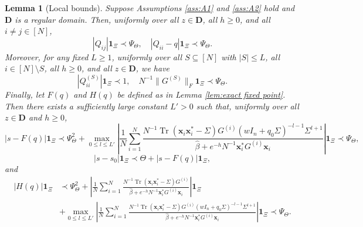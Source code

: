 \documentclass[11pt,reqno]{amsart}
\def\x{\mathbf{x}}
\def\1{\mathbf{1}}
\def\bD{\mathbf{D}}
\def\Tr{\operatorname{Tr}}
\newtheorem{lemma}[theorem]{Lemma}
\theoremstyle{definition}
\numberwithin{equation}{section}
\numberwithin{figure}{section}
\begin{document}
\begin{lemma}[Local bounds]\label{lem:local bounds}
Suppose Assumptions \ref{ass:A1} and \ref{ass:A2} hold and $\bD$ is a regular domain. Then, uniformly over all $z\in\bD$, all $h\geq 0$, and all $i\neq j\in[N]$,
\[
    |Q_{ij}|\1_\Xi\prec \Psi_\Theta,\quad |Q_{ii}-q|\1_\Xi\prec\Psi_\Theta.
\]
Moreover, for any fixed $L\ge 1$, uniformly over all $S\subseteq[N]$ with $|S|\leq L$, all $i\in[N]\setminus S$, all $h\geq 0$, and all $z\in\bD$, we have
\[
    |Q_{ii}^{(S)}|\1_\Xi\prec 1,\quad N^{-1}\|G^{(S)}\|_F\1_\Xi\prec\Psi_\Theta. 
\]
Finally, let $F(q)$ and $H(q)$ be defined as in Lemma \ref{lem:exact fixed point}. Then there exists a sufficiently large constant $L'>0$ such that, uniformly over all $z\in\bD$ and $h\geq 0$,
\[
    |s-F(q)|\1_\Xi\prec\Psi_\Theta^2+\max_{0\leq l\leq L'}\left|\frac{1}{N}\sum_{i=1}^N\frac{N^{-1}\Tr(\x_i\x_i^*-\Sigma)G^{(i)}(wI_n+q_0\Sigma)^{-l-1}\Sigma^{l+1}}{\hat\beta+e^{-h}N^{-1}\x_i^*G^{(i)}\x_i}\right|\1_\Xi\prec \Psi_\Theta,
\]
\[
    |s-s_0|\1_\Xi\prec\Theta+|s-F(q)|\1_\Xi,
\]
and
\begin{align*}
    |H(q)|\1_\Xi&\prec \Psi_\Theta^2+\left|\frac{1}{N}\sum_{i=1}^N\frac{N^{-1}\Tr(\x_i\x_i^*-\Sigma)G^{(i)}}{\hat\beta+e^{-h}N^{-1}\x_i^*G^{(i)}\x_i}\right|\1_\Xi\\
    &+\max_{0\leq l\leq L'}\left|\frac{1}{N}\sum_{i=1}^N\frac{N^{-1}\Tr(\x_i\x_i^*-\Sigma)G^{(i)}(wI_n+q_0\Sigma)^{-l-1}\Sigma^{l+1}}{\hat\beta+e^{-h}N^{-1}\x_i^*G^{(i)}\x_i}\right|\1_\Xi\prec \Psi_\Theta.
\end{align*}
\end{lemma}
\end{document}

